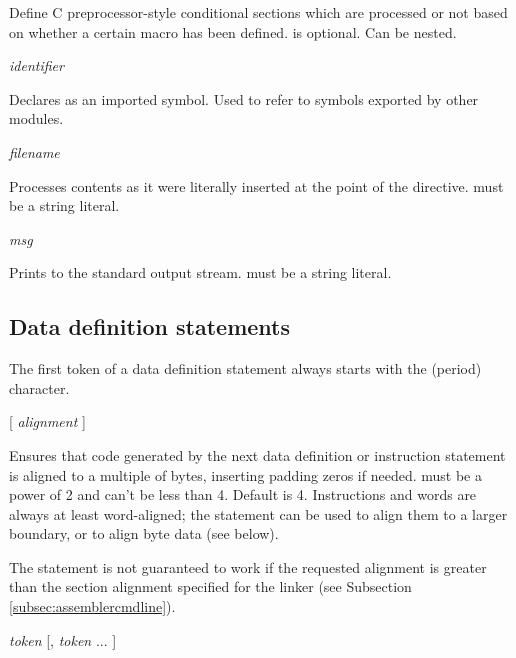 \documentclass[a4paper,12pt,twoside,extrafontsizes]{memoir}
\begin{document}
Define C preprocessor-style conditional sections which are processed or not based on whether a certain macro has been defined.  is optional. Can be nested.

\begin{codepar}
 \emph{identifier}
\end{codepar}

Declares  as an imported symbol. Used to refer to symbols exported by other modules.

\begin{codepar}
 \emph{filename}
\end{codepar}

Processes  contents as it were literally inserted at the point of the  directive.  must be a string literal.

\begin{codepar}
 \emph{msg}
\end{codepar}

Prints  to the standard output stream.  must be a string literal.

\subsection{Data definition statements}

The first token of a data definition statement always starts with the  (period) character.

\begin{codepar}
 [ \emph{alignment} ]
\end{codepar}

Ensures that code generated by the next data definition or instruction statement is aligned to a multiple of  bytes, inserting padding zeros if needed.  must be a power of 2 and can't be less than 4. Default  is 4. Instructions and words are always at least word-aligned; the  statement can be used to align them to a larger boundary, or to align byte data (see below).

The  statement is not guaranteed to work if the requested alignment is greater than the section alignment specified for the linker (see Subsection \ref{subsec:assemblercmdline}).

\begin{codepar}
 \emph{token} [, \emph{token} ... ]
\end{codepar}
\end{document}
